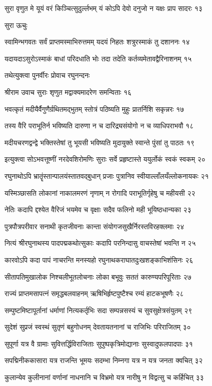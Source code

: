 सुरा वृणुत मे यूयं वरं किञ्चित्सुदुर्ल्लभम्
यं कोऽपि देवो दनुजो न यक्षः प्राप सादरः १३

सुरा ऊचुः

स्वामिन्भगवतः सर्वं प्राप्तमस्माभिरुत्तमम्
यदयं निहतः शत्रुरस्माकं तु दशाननः १४

यदायदाऽसुरोऽस्माकं बाधां परिदधाति भोः
तदा तदेति कर्तव्यमेतावद्वैरिनाशनम् १५

तथेत्युक्त्वा पुनर्वीरः प्रोवाच रघुनन्दनः

श्रीराम उवाच
सुराः शृणुत मद्वाक्यमादरेण समन्विताः १६

भवत्कृतं मदीयैर्वैगुणैर्ग्रथितमद्भुतम्
स्तोत्रं पठिष्यति मुहुः प्रातर्निशि सकृन्नरः १७

तस्य वैरि पराभूतिर्न भविष्यति दारुणा
न च दारिद्र्यसंयोगो न च व्याधिपराभवौ १८

मदीयचरणद्वन्द्वे भक्तिस्तेषां तु भूयसी
भविष्यति मुदायुक्ते स्वान्ते पुंसां तु पाठतः १९

इत्युक्त्वा सोऽभवत्तूष्णीं नरदेवशिरोमणिः
सुराः सर्वे प्रहृष्टास्ते ययुर्लोकं स्वकं स्वकम् २०

रघुनाथोऽपि भ्रातॄंस्तान्पालयंस्तातवद्बुधान्
प्रजाः पुत्रानिव स्वीयाल्लाँलयँल्लोकनायकः २१

यस्मिञ्छासति लोकानां नाकालमरणं नृणाम्
न रोगादि पराभूतिर्गृहेषु च महीयसी २२

नेतिः कदापि द्दश्येत वैरिजं भयमेव च
वृक्षाः सदैव फलिनो मही भूयिष्ठधान्यका २३

पुत्रपौत्रपरीवार सनाथी कृतजीवनाः
कान्ता संयोगजसुखैर्निरस्तविरहक्लमाः २४

नित्यं श्रीरघुनाथस्य पादपद्मकथोत्सुकाः
कदापि परनिन्दासु वाचस्तेषां भवन्ति न २५

कारवोऽपि कदा पापं नाचरन्ति मनस्यहो
रघुनाथकराघातदुःखशङ्काभिशंसिनः २६

सीतापतिमुखालोक निश्चलीभूतलोचनाः
लोका बभूवुः सततं कारुण्यपरिपूरिताः २७

राज्यं प्राप्तमसापत्नं समृद्धबलवाहनम्
ऋषिभिर्हृष्टपुष्टैश्च रम्यं हाटकभूषणैः २८

सम्पुष्टमिष्टापूर्तानां धर्माणां नित्यकर्तृभिः
सदा सम्पन्नसस्यं च सुवसुक्षेत्रसंयुतम् २९

सुदेशं सुप्रजं स्वस्थं सुतृणं बहुगोधनम्
देवतायतनानां च राजिभिः परिराजितम् ३०

सुपूर्णा यत्र वै ग्रामाः सुवित्तर्द्धिविराजिताः
सुपुष्पकृत्रिमोद्यानाः सुस्वादुफलपादपाः ३१

सपद्मिनीककासारा यत्र राजन्ति भूमयः
सदम्भा निम्नगा यत्र न यत्र जनता क्वचित् ३२

कुलान्येव कुलीनानां वर्णानां नाधनानि च
विभ्रमो यत्र नारीषु न विद्वत्सु च कर्हिचित् ३३

